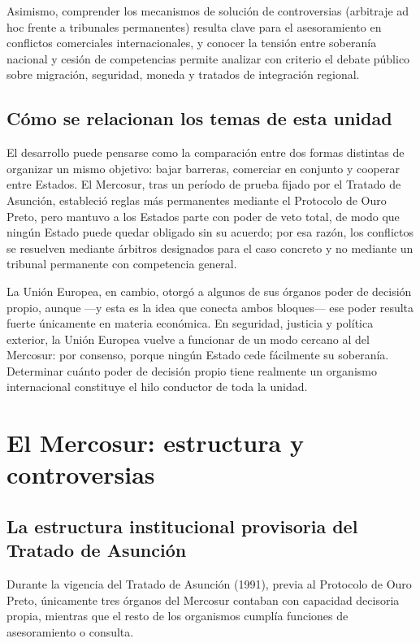 \documentclass[12pt,oneside]{book}
\begin{document}
Asimismo, comprender los mecanismos de solución de controversias (arbitraje ad hoc frente a tribunales permanentes) resulta clave para el asesoramiento en conflictos comerciales internacionales, y conocer la tensión entre soberanía nacional y cesión de competencias permite analizar con criterio el debate público sobre migración, seguridad, moneda y tratados de integración regional.

\section*{Cómo se relacionan los temas de esta unidad}

El desarrollo puede pensarse como la comparación entre dos formas distintas de organizar un mismo objetivo: bajar barreras, comerciar en conjunto y cooperar entre Estados. El Mercosur, tras un período de prueba fijado por el Tratado de Asunción, estableció reglas más permanentes mediante el Protocolo de Ouro Preto, pero mantuvo a los Estados parte con poder de veto total, de modo que ningún Estado puede quedar obligado sin su acuerdo; por esa razón, los conflictos se resuelven mediante árbitros designados para el caso concreto y no mediante un tribunal permanente con competencia general.

La Unión Europea, en cambio, otorgó a algunos de sus órganos poder de decisión propio, aunque —y esta es la idea que conecta ambos bloques— ese poder resulta fuerte únicamente en materia económica. En seguridad, justicia y política exterior, la Unión Europea vuelve a funcionar de un modo cercano al del Mercosur: por consenso, porque ningún Estado cede fácilmente su soberanía. Determinar cuánto poder de decisión propio tiene realmente un organismo internacional constituye el hilo conductor de toda la unidad.

\chapter{El Mercosur: estructura y controversias}

\section{La estructura institucional provisoria del Tratado de Asunción}

Durante la vigencia del Tratado de Asunción (1991), previa al Protocolo de Ouro Preto, únicamente tres órganos del Mercosur contaban con capacidad decisoria propia, mientras que el resto de los organismos cumplía funciones de asesoramiento o consulta.
\end{document}
